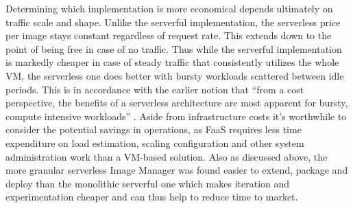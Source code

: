 Determining which implementation is more economical depends ultimately on traffic scale and shape. Unlike the serverful implementation, the serverless price per image stays constant regardless of request rate. This extends down to the point of being free in case of no traffic. Thus while the serverful implementation is markedly cheaper in case of steady traffic that consistently utilizes the whole VM, the serverless one does better with bursty workloads scattered between idle periods. This is in accordance with the earlier notion that ``from a cost perspective, the benefits of a serverless architecture are most apparent for bursty, compute intensive workloads'' \parencite{baldini17currentTrends}. Aside from infrastructure costs it's worthwhile to consider the potential savings in operations, as FaaS requires less time expenditure on load estimation, scaling configuration and other system administration work than a VM-based solution. Also as discussed above, the more granular serverless Image Manager was found easier to extend, package and deploy than the monolithic serverful one which makes iteration and experimentation cheaper and can thus help to reduce time to market.
